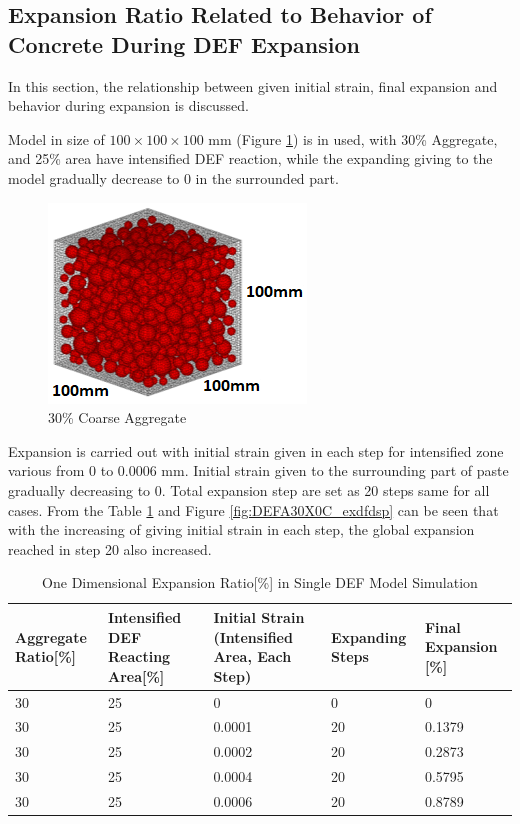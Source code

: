 \clearpage
\subsection{Expansion Ratio Related to Behavior of Concrete During DEF Expansion}

In this section, the relationship between given initial strain, final expansion and behavior during expansion is discussed.

Model in size of $100 \times 100 \times 100$ mm (Figure \ref{fig:A30_mfsfsfodel}) is in used, with 30\% Aggregate, and 25\% area have intensified DEF reaction, while the expanding giving to the model gradually decrease to 0 in the surrounded part.

\begin{figure}[ht]
\centering
\includegraphics[width=.3\linewidth]{Files/Aggregate/A30.png}
  \caption{30\% Coarse Aggregate}
  \label{fig:A30_mfsfsfodel}
\end{figure}

Expansion is carried out with initial strain given in each step for intensified zone various from 0 to 0.0006 mm. Initial strain given to the surrounding part of paste gradually decreasing to 0. Total expansion step are set as 20 steps same for all cases. From the Table \ref{table:DEF_X0C_EXP} and Figure \ref{fig:DEFA30X0C_exdfdsp} can be seen that with the increasing of giving initial strain in each step, the global expansion reached in step 20 also increased.

\begin{table}[ht!]
  \caption{One Dimensional Expansion Ratio[\%] in Single DEF Model Simulation}
\centering
\begin{tabular}{ ||p{2cm}|p{2cm}|p{2cm}|p{2cm}|p{2cm}|| }
 \hline
 Aggregate Ratio[\%] &  Intensified DEF Reacting Area[\%]  & Initial Strain (Intensified Area, Each Step) & Expanding Steps & Final Expansion [\%] \\ [0.5ex]
 \hline\hline
 30 & 25 & 0 & 0 & 0\\
 30 & 25 & 0.0001 & 20 & 0.1379\\
 30 & 25 & 0.0002 & 20 & 0.2873\\
 30 & 25 & 0.0004 & 20 & 0.5795\\
 30 & 25 & 0.0006 & 20 & 0.8789\\

 \hline
\end{tabular}

\label{table:DEF_X0C_EXP}
\end{table}

